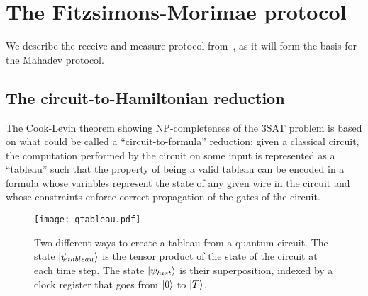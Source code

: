 \section{The Fitzsimons-Morimae protocol}

We describe the receive-and-measure protocol from~\cite{morimae2016post}, as it will form the basis for the Mahadev protocol. 


\subsection{The circuit-to-Hamiltonian reduction}
\label{sec:certificates-q}

The Cook-Levin theorem showing NP-completeness of the $3$SAT problem is based on what could be called a ``circuit-to-formula'' reduction: given a classical circuit, the computation performed by the circuit on some input is represented as a ``tableau'' such that the property of being a valid tableau can be encoded in a formula whose variables represent the state of any given wire in the circuit and whose constraints enforce correct propagation of the gates of the circuit. 

\begin{figure}[htb!]
\centering%
\texttt{[image: qtableau.pdf]}
\caption{Two different ways to create a tableau from a quantum circuit. The state $|\psi_{tableau}\rangle$ is the tensor product of the state of the circuit at each time step. The state $|\psi_{hist}\rangle$ is their superposition, indexed by a clock register that goes from $|0\rangle$ to $|T\rangle$.}
\label{fig:q-tableau}
\end{figure}


